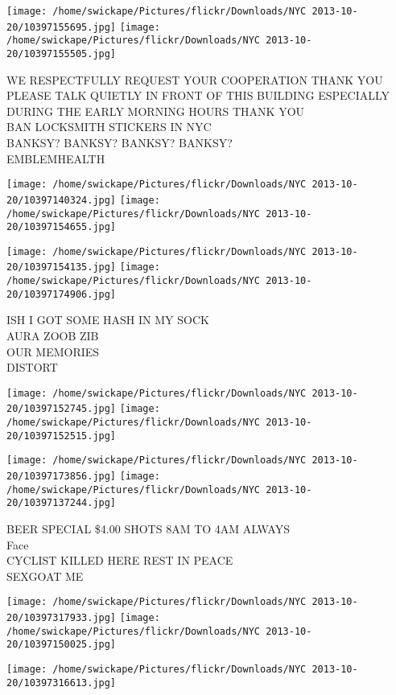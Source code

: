 \documentclass[10pt,letterpaper]{article}
\begin{document}
\texttt{[image: /home/swickape/Pictures/flickr/Downloads/NYC 2013-10-20/10397155695.jpg]}
\texttt{[image: /home/swickape/Pictures/flickr/Downloads/NYC 2013-10-20/10397155505.jpg]}

WE RESPECTFULLY REQUEST YOUR COOPERATION THANK YOU PLEASE TALK QUIETLY IN FRONT OF THIS BUILDING ESPECIALLY DURING THE EARLY MORNING HOURS THANK YOU\\
BAN LOCKSMITH STICKERS IN NYC\\
BANKSY? BANKSY? BANKSY? BANKSY?\\
EMBLEMHEALTH\\
\pagebreak

\texttt{[image: /home/swickape/Pictures/flickr/Downloads/NYC 2013-10-20/10397140324.jpg]}
\texttt{[image: /home/swickape/Pictures/flickr/Downloads/NYC 2013-10-20/10397154655.jpg]}

\texttt{[image: /home/swickape/Pictures/flickr/Downloads/NYC 2013-10-20/10397154135.jpg]}
\texttt{[image: /home/swickape/Pictures/flickr/Downloads/NYC 2013-10-20/10397174906.jpg]}

ISH I GOT SOME HASH IN MY SOCK\\
AURA ZOOB ZIB\\
OUR MEMORIES\\
DISTORT\\
\pagebreak

\texttt{[image: /home/swickape/Pictures/flickr/Downloads/NYC 2013-10-20/10397152745.jpg]}
\texttt{[image: /home/swickape/Pictures/flickr/Downloads/NYC 2013-10-20/10397152515.jpg]}

\texttt{[image: /home/swickape/Pictures/flickr/Downloads/NYC 2013-10-20/10397173856.jpg]}
\texttt{[image: /home/swickape/Pictures/flickr/Downloads/NYC 2013-10-20/10397137244.jpg]}

BEER SPECIAL \$4.00 SHOTS 8AM TO 4AM ALWAYS\\
Face\\
CYCLIST KILLED HERE REST IN PEACE\\
SEXGOAT ME\\
\pagebreak

\texttt{[image: /home/swickape/Pictures/flickr/Downloads/NYC 2013-10-20/10397317933.jpg]}
\texttt{[image: /home/swickape/Pictures/flickr/Downloads/NYC 2013-10-20/10397150025.jpg]}

\vspace{0.25in}
\texttt{[image: /home/swickape/Pictures/flickr/Downloads/NYC 2013-10-20/10397316613.jpg]}
\end{document}
